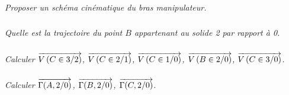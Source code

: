 \documentclass[10pt,oneside]{article}
\begin{document}
\subparagraph{}
\textit{Proposer un schéma cinématique du bras manipulateur.}

\subparagraph{}
\textit{Quelle est la trajectoire du point $B$ appartenant au solide 2 par rapport à 0.}

\subparagraph{}
\textit{Calculer $\overrightarrow{V\left( {C} \in {3}/{2}\right)}$, $\overrightarrow{V\left( {C} \in {2}/{1}\right)}$, $\overrightarrow{V\left( {C} \in {1}/{0}\right)}$, $\overrightarrow{V\left( {B} \in {2}/{0}\right)}$, $\overrightarrow{V\left( {C} \in {3}/{0}\right)}$.}

\subparagraph{}
\textit{Calculer $\overrightarrow{\Gamma(A,2/0)}$, $\overrightarrow{\Gamma(B,2/0)}$, $\overrightarrow{\Gamma(C,2/0)}$.}
\end{document}
